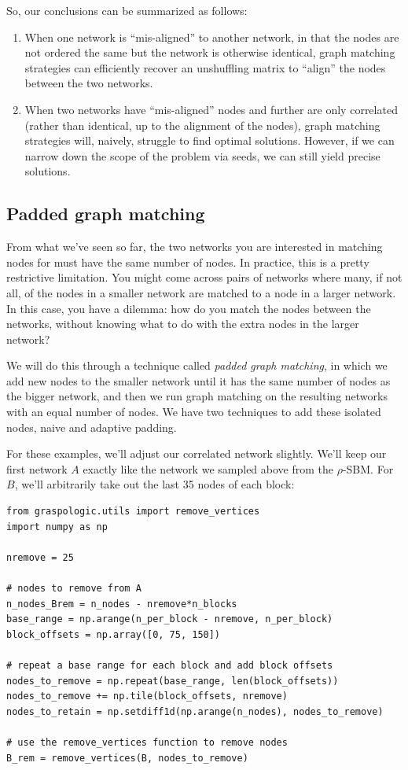 So, our conclusions can be summarized as follows:
\begin{enumerate}
    \item When one network is ``mis-aligned'' to another network, in that the nodes are not ordered the same but the network is otherwise identical, graph matching strategies can efficiently recover an unshuffling matrix to ``align'' the nodes between the two networks.
    \item When two networks have ``mis-aligned'' nodes and further are only correlated (rather than identical, up to the alignment of the nodes), graph matching strategies will, naively, struggle to find optimal solutions. However, if we can narrow down the scope of the problem via seeds, we can still yield precise solutions.
\end{enumerate}

\subsection{Padded graph matching}

From what we've seen so far, the two networks you are interested in matching nodes for must have the same number of nodes. In practice, this is a pretty restrictive limitation. You might come across pairs of networks where many, if not all, of the nodes in a smaller network are matched to a node in a larger network. In this case, you have a dilemma: how do you match the nodes between the networks, without knowing what to do with the extra nodes in the larger network?

We will do this through a technique called \textit{padded graph matching}, in which we add new nodes to the smaller network until it has the same number of nodes as the bigger network, and then we run graph matching on the resulting networks with an equal number of nodes.  We have two techniques to add these isolated nodes, naive and adaptive padding.

For these examples, we'll adjust our correlated network slightly. We'll keep our first network $A$ exactly like the network we sampled above from the $\rho$-SBM. For $B$, we'll arbitrarily take out the last 35 nodes of each block:

\begin{lstlisting}[style=python]
from graspologic.utils import remove_vertices
import numpy as np

nremove = 25

# nodes to remove from A
n_nodes_Brem = n_nodes - nremove*n_blocks
base_range = np.arange(n_per_block - nremove, n_per_block)
block_offsets = np.array([0, 75, 150])

# repeat a base range for each block and add block offsets
nodes_to_remove = np.repeat(base_range, len(block_offsets)) 
nodes_to_remove += np.tile(block_offsets, nremove)
nodes_to_retain = np.setdiff1d(np.arange(n_nodes), nodes_to_remove)

# use the remove_vertices function to remove nodes
B_rem = remove_vertices(B, nodes_to_remove)
\end{lstlisting}

